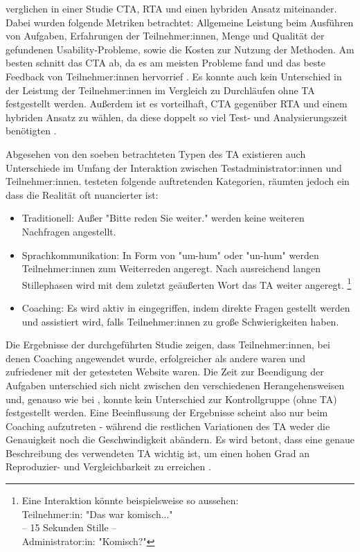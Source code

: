\textcite{alhadretiRethinkingThinking2018} verglichen in einer Studie \ac{CTA}, \ac{RTA} und einen hybriden Ansatz miteinander. Dabei wurden folgende Metriken betrachtet: Allgemeine Leistung beim Ausführen von Aufgaben, Erfahrungen der Teilnehmer:innen, Menge und Qualität der gefundenen Usability-Probleme, sowie die Kosten zur Nutzung der Methoden. Am besten schnitt das \acl{CTA} ab, da es am meisten Probleme fand und das beste Feedback von Teilnehmer:innen hervorrief \parencite{alhadretiRethinkingThinking2018}. Es konnte auch kein Unterschied in der Leistung der Teilnehmer:innen im Vergleich zu Durchläufen ohne \ac{TA} festgestellt werden. Außerdem ist es vorteilhaft, \ac{CTA} gegenüber \ac{RTA} und einem hybriden Ansatz zu wählen, da diese doppelt so viel Test- und Analysierungszeit benötigten \parencite{alhadretiRethinkingThinking2018}.

Abgesehen von den soeben betrachteten Typen des \acl{TA} existieren auch Unterschiede im Umfang der Interaktion zwischen Testadministrator:innen und Teilnehmer:innen. \textcite{olmsted-hawalaThinkaloudProtocols2010} testeten folgende auftretenden Kategorien, räumten jedoch ein dass die Realität oft nuancierter ist:
\begin{itemize}
  \item Traditionell: Außer "Bitte reden Sie weiter." werden keine weiteren Nachfragen angestellt.
  \item Sprachkommunikation: In Form von "um-hum" oder "un-hum" werden Teilnehmer:innen zum Weiterreden angeregt. Nach ausreichend langen Stillephasen wird mit dem zuletzt geäußerten Wort das \acl{TA} weiter angeregt. \footnote{Eine Interaktion könnte beispielsweise so aussehen:\\ Teilnehmer:in: "Das war komisch..." \\ -- 15 Sekunden Stille -- \\ Administrator:in: "Komisch?"}
  \item Coaching: Es wird aktiv in eingegriffen, indem direkte Fragen gestellt werden und assistiert wird, falls Teilnehmer:innen zu große Schwierigkeiten haben.
\end{itemize}
Die Ergebnisse der \citeyear{olmsted-hawalaThinkaloudProtocols2010} durchgeführten Studie zeigen, dass Teilnehmer:innen, bei denen Coaching angewendet wurde, erfolgreicher als andere waren und zufriedener mit der getesteten Website waren. Die Zeit zur Beendigung der Aufgaben unterschied sich nicht zwischen den verschiedenen Herangehensweisen und, genauso wie bei \citeauthor{alhadretiRethinkingThinking2018}, konnte kein Unterschied zur Kontrollgruppe (ohne \ac{TA}) festgestellt werden. Eine Beeinflussung der Ergebnisse scheint also nur beim Coaching aufzutreten - während die restlichen Variationen des \ac{TA} weder die Genauigkeit noch die Geschwindigkeit abändern. Es wird betont, dass eine genaue Beschreibung des verwendeten \acl{TA} wichtig ist, um einen hohen Grad an Reproduzier- und Vergleichbarkeit zu erreichen \parencite{alhadretiRethinkingThinking2018}.

